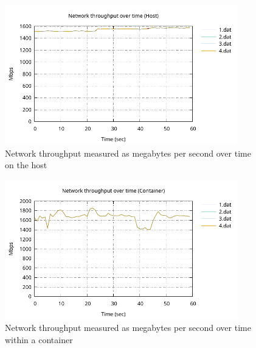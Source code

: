 \begin{figure}[H]
    \centering
    \includegraphics[width=0.9\textwidth]{images/results/network-host-throughput.pdf}
    \caption{Network throughput measured as megabytes per second over time on the host}
    \label{images:experiment/network-host-throughput.pdf}
\end{figure}

\begin{figure}[H]
    \centering
    \includegraphics[width=0.9\textwidth]{images/results/network-throughput-container.pdf}
    \caption{Network throughput measured as megabytes per second over time within a container}
    \label{images:experiment/network-throughput-container.pdf}
\end{figure}
